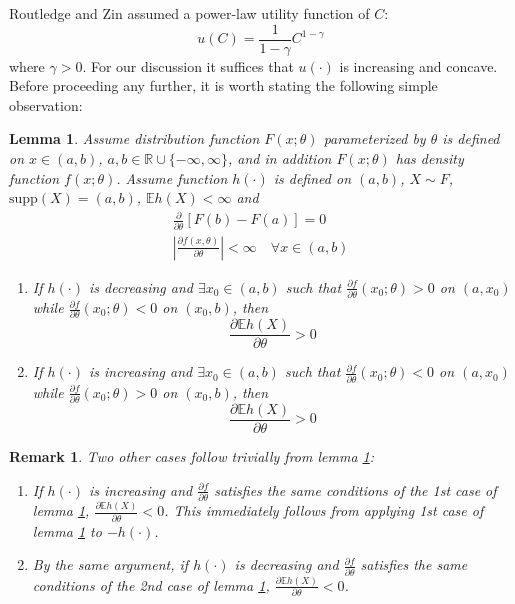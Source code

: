 \documentclass{article}
\newcommand{\pd}[2]{
  \frac{\partial #1}{\partial #2}
}
\newcommand{\opd}[1]{
  \frac{\partial}{\partial #1}
}
\newcommand{\E}{
  \mathbb{E}
}
\newcommand{\1}[1]{
  \mathbf{1}_{\{#1\}}
}
\newtheorem{lemma}{Lemma}
\newtheorem{remark}{Remark}
\begin{document}
Routledge and Zin \cite{routledge2010generalized} assumed
a power-law utility function of $C$:
\begin{equation}
  \label{eq:power_utility}
  u(C)=\frac{1}{1-\gamma}C^{1-\gamma}%
\end{equation}
where $\gamma > 0$. For our discussion it suffices that $u(\cdot)$ is
increasing and concave. Before proceeding any further, it is worth
stating the following simple observation:
\begin{lemma} \label{lemma:I}
  Assume distribution function $F(x; \theta)$ parameterized by
  $\theta$ is defined on $x \in (a, b)$, $a, b \in \mathbb R \cup
  \{-\infty, \infty\}$, and in addition $F(x; \theta)$ has density
  function $f(x; \theta)$. Assume function $h(\cdot)$ is defined on
  $(a, b)$, $X \sim F$, $\text{supp}(X) = (a,b)$,
  $\E h(X) < \infty$ and
  \begin{eqnarray*}
    \opd{\theta}\left[
      F(b) - F(a)
    \right] = 0 \\
    \left| \pd{f(x, \theta)}{\theta} \right| < \infty
    \quad \forall x \in (a, b)
  \end{eqnarray*}
  \begin{enumerate}
  \item If $h(\cdot)$ is decreasing and $\exists x_0 \in (a, b)$ such that
    $\pd{f}{\theta}(x_0; \theta) > 0$ on $(a, x_0)$ while
    $\pd{f}{\theta}(x_0; \theta) < 0$ on $(x_0, b)$, then
    \[
    \pd{\E h(X)}{\theta} > 0
    \]
  \item If $h(\cdot)$ is increasing and $\exists x_0 \in (a, b)$ such that 
    $\pd{f}{\theta}(x_0; \theta) < 0$ on $(a, x_0)$  while
    $\pd{f}{\theta}(x_0; \theta) > 0$ on $(x_0, b)$, then
    \[
    \pd{\E h(X)}{\theta} > 0
    \]
  \end{enumerate}
\end{lemma}
\begin{remark}
  \label{remark:I}
  Two other cases follow trivially from lemma \ref{lemma:I}:
  \begin{enumerate}
  \item If $h(\cdot)$ is increasing and $\pd{f}{\theta}$ satisfies the
    same conditions of the 1st case of lemma \ref{lemma:I},
    $\pd{\E h(X)}{\theta} < 0$. This immediately follows from applying
    1st case of lemma \ref{lemma:I} to $-h(\cdot)$.
  \item By the same argument, if $h(\cdot)$ is decreasing and
    $\pd{f}{\theta}$ satisfies the same conditions of the 2nd case of
    lemma \ref{lemma:I}, $\pd{\E h(X)}{\theta} < 0$.
  \end{enumerate}
\end{remark}
\end{document}
